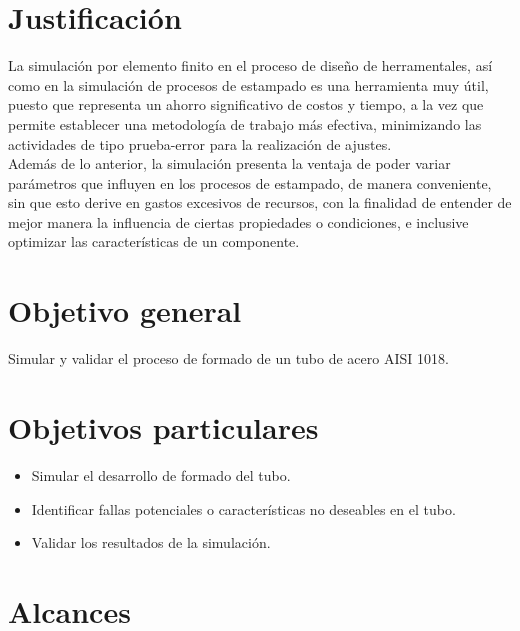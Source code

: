 \section{Justificación}

La simulación por elemento finito en el proceso de diseño de herramentales, así como en 
la simulación de procesos de estampado es una herramienta muy útil, puesto que representa un ahorro 
significativo de costos y tiempo, a la vez que permite establecer una metodología de trabajo más efectiva, minimizando las 
actividades de tipo prueba-error para la realización de ajustes.\\

Además de lo anterior, la simulación presenta la ventaja de poder variar parámetros que influyen en los procesos de 
estampado, de manera conveniente, sin que esto derive en gastos excesivos de recursos, con la finalidad de entender 
de mejor manera la influencia de ciertas propiedades o condiciones, e inclusive optimizar las características 
de un componente.

\section{Objetivo general}

Simular y validar el proceso de formado de un tubo de acero AISI 1018.

\section{Objetivos particulares}
\begin{itemize}
\item Simular el desarrollo de formado del tubo.
\item Identificar fallas potenciales o características no deseables en el tubo.
\item Validar los resultados de la simulación.
\end{itemize}


\section{Alcances}

